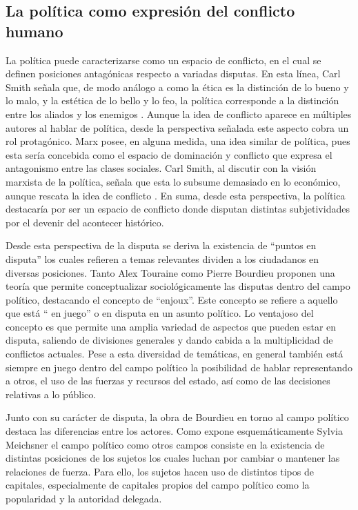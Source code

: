 \documentclass[12pt,twoside]{templates/facsothesis}
\begin{document}
\hypertarget{la-poluxedtica-como-expresiuxf3n-del-conflicto-humano}{%
\subsection{La política como expresión del conflicto humano}\label{la-poluxedtica-como-expresiuxf3n-del-conflicto-humano}}

La política puede caracterizarse como un espacio de conflicto, en el cual se definen posiciones antagónicas respecto a variadas disputas. En esta línea, Carl Smith señala que, de modo análogo a como la ética es la distinción de lo bueno y lo malo, y la estética de lo bello y lo feo, la política corresponde a la distinción entre los aliados y los enemigos \citep{schmitt_concept_1996}. Aunque la idea de conflicto aparece en múltiples autores al hablar de política, desde la perspectiva señalada este aspecto cobra un rol protagónico. Marx posee, en alguna medida, una idea similar de política, pues esta sería concebida como el espacio de dominación y conflicto que expresa el antagonismo entre las clases sociales. Carl Smith, al discutir con la visión marxista de la política, señala que esta lo subsume demasiado en lo económico, aunque rescata la idea de conflicto \citep{paredes_Marx_2018}. En suma, desde esta perspectiva, la política destacaría por ser un espacio de conflicto donde disputan distintas subjetividades por el devenir del acontecer histórico.

Desde esta perspectiva de la disputa se deriva la existencia de ``puntos en disputa'' los cuales refieren a temas relevantes dividen a los ciudadanos en diversas posiciones. Tanto Alex Touraine como Pierre Bourdieu proponen una teoría que permite conceptualizar sociológicamente las disputas dentro del campo político, destacando el concepto de ``enjoux''. Este concepto se refiere a aquello que está `` en juego'' o en disputa en un asunto político. Lo ventajoso del concepto es que permite una amplia variedad de aspectos que pueden estar en disputa, saliendo de divisiones generales y dando cabida a la multiplicidad de conflictos actuales. Pese a esta diversidad de temáticas, en general también está siempre en juego dentro del campo político la posibilidad de hablar representando a otros, el uso de las fuerzas y recursos del estado, así como de las decisiones relativas a lo público.

Junto con su carácter de disputa, la obra de Bourdieu en torno al campo político destaca las diferencias entre los actores. Como expone esquemáticamente Sylvia Meichsner el campo político como otros campos consiste en la existencia de distintas posiciones de los sujetos los cuales luchan por cambiar o mantener las relaciones de fuerza. Para ello, los sujetos hacen uso de distintos tipos de capitales, especialmente de capitales propios del campo político como la popularidad y la autoridad delegada.
\end{document}
